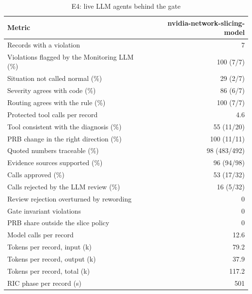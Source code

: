 \begin{table}[!t]
\centering
\caption{E4: live LLM agents behind the gate}\label{tab:live}
\footnotesize
\setlength{\tabcolsep}{3pt}
\begin{tabular}{@{}lr@{}}
\toprule
Metric & nvidia-network-slicing-model \\
\midrule
Records with a violation & 7 \\
Violations flagged by the Monitoring LLM (\%) & 100 (7/7) \\
Situation not called normal (\%) & 29 (2/7) \\
Severity agrees with code (\%) & 86 (6/7) \\
Routing agrees with the rule (\%) & 100 (7/7) \\
Protected tool calls per record & 4.6 \\
Tool consistent with the diagnosis (\%) & 55 (11/20) \\
PRB change in the right direction (\%) & 100 (11/11) \\
Quoted numbers traceable (\%) & 98 (483/492) \\
Evidence sources supported (\%) & 96 (94/98) \\
Calls approved (\%) & 53 (17/32) \\
Calls rejected by the LLM review (\%) & 16 (5/32) \\
Review rejection overturned by rewording & 0 \\
Gate invariant violations & 0 \\
PRB share outside the slice policy & 0 \\
Model calls per record & 12.6 \\
Tokens per record, input (k) & 79.2 \\
Tokens per record, output (k) & 37.9 \\
Tokens per record, total (k) & 117.2 \\
RIC phase per record (s) & 501 \\
\bottomrule
\end{tabular}
\end{table}
